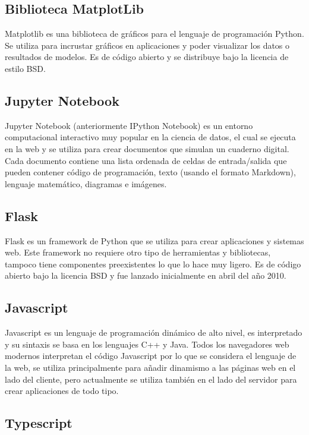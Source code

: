 \subsection{Biblioteca MatplotLib}

Matplotlib es una biblioteca de gráficos para el lenguaje de programación Python. Se utiliza para incrustar gráficos en aplicaciones y poder visualizar los datos o resultados de modelos. Es de código abierto y se distribuye bajo la licencia de estilo BSD.
	
\subsection{Jupyter Notebook}

Jupyter Notebook (anteriormente IPython Notebook) es un entorno computacional interactivo muy popular en la ciencia de datos, el cual se ejecuta en la web y se utiliza para crear documentos que simulan un cuaderno digital. Cada documento contiene una lista ordenada de celdas de entrada/salida que pueden contener código de programación, texto (usando el formato Markdown), lenguaje matemático, diagramas e imágenes. 
	
\subsection{Flask}

Flask es un framework de Python que se utiliza para crear aplicaciones y sistemas web. Este framework no requiere otro tipo de herramientas y bibliotecas, tampoco tiene componentes preexistentes lo que lo hace muy ligero. Es de código abierto bajo la licencia BSD y fue lanzado inicialmente en abril del año 2010.

\subsection{Javascript}

Javascript es un lenguaje de programación dinámico de alto nivel, es interpretado y su sintaxis se basa en los lenguajes C++ y Java. Todos los navegadores web modernos interpretan el código Javascript por lo que se considera el lenguaje de la web, se utiliza principalmente para añadir dinamismo a las páginas web en el lado del cliente, pero actualmente se utiliza también en el lado del servidor para crear aplicaciones de todo tipo.

\subsection{Typescript}

